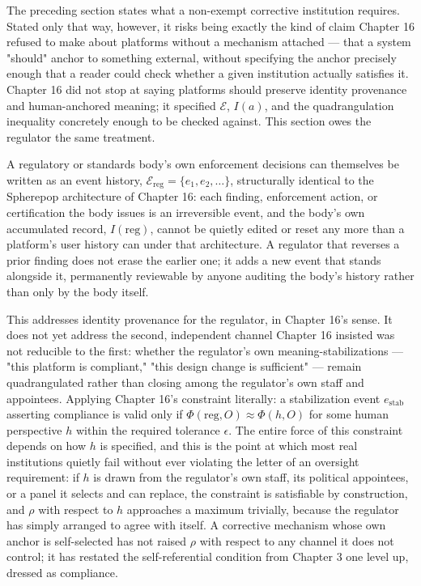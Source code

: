 \documentclass[12pt,a4paper]{book}
\begin{document}
The preceding section states what a non-exempt corrective institution requires. Stated only that way, however, it risks being exactly the kind of claim Chapter 16 refused to make about platforms without a mechanism attached — that a system "should" anchor to something external, without specifying the anchor precisely enough that a reader could check whether a given institution actually satisfies it. Chapter 16 did not stop at saying platforms should preserve identity provenance and human-anchored meaning; it specified $\mathcal{E}$, $I(a)$, and the quadrangulation inequality concretely enough to be checked against. This section owes the regulator the same treatment.

A regulatory or standards body's own enforcement decisions can themselves be written as an event history, $\mathcal{E}_{\mathrm{reg}} = \{e_1, e_2, \ldots\}$, structurally identical to the Spherepop architecture of Chapter 16: each finding, enforcement action, or certification the body issues is an irreversible event, and the body's own accumulated record, $I(\mathrm{reg})$, cannot be quietly edited or reset any more than a platform's user history can under that architecture. A regulator that reverses a prior finding does not erase the earlier one; it adds a new event that stands alongside it, permanently reviewable by anyone auditing the body's history rather than only by the body itself.

This addresses identity provenance for the regulator, in Chapter 16's sense. It does not yet address the second, independent channel Chapter 16 insisted was not reducible to the first: whether the regulator's own meaning-stabilizations — "this platform is compliant," "this design change is sufficient" — remain quadrangulated rather than closing among the regulator's own staff and appointees. Applying Chapter 16's constraint literally: a stabilization event $e_{\mathrm{stab}}$ asserting compliance is valid only if $\Phi(\mathrm{reg}, O) \approx \Phi(h, O)$ for some human perspective $h$ within the required tolerance $\epsilon$. The entire force of this constraint depends on how $h$ is specified, and this is the point at which most real institutions quietly fail without ever violating the letter of an oversight requirement: if $h$ is drawn from the regulator's own staff, its political appointees, or a panel it selects and can replace, the constraint is satisfiable by construction, and $\rho$ with respect to $h$ approaches a maximum trivially, because the regulator has simply arranged to agree with itself. A corrective mechanism whose own anchor is self-selected has not raised $\rho$ with respect to any channel it does not control; it has restated the self-referential condition from Chapter 3 one level up, dressed as compliance.
\end{document}
